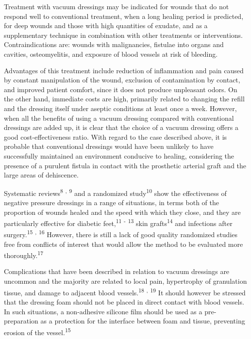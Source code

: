\documentclass[numberinsection,times,10pt,spreadimages]{memoir}
\begin{document}
Treatment with vacuum dressings may be indicated for wounds that do not respond
well to conventional treatment, when a long healing period is predicted, for
deep wounds and those with high quantities of exudate, and as a supplementary
technique in combination with other treatments or interventions.
Contraindications are: wounds with malignancies, fistulae into organs and
cavities, osteomyelitis, and exposure of blood vessels at risk of bleeding.

Advantages of this treatment include reduction of inflammation and pain caused
by
constant manipulation of the wound, exclusion of contamination by contact, and
improved patient comfort, since it does not produce unpleasant odors. On the
other hand, immediate costs are high, primarily related to changing the refill
and the dressing itself under aseptic conditions at least once a week. However,
when all the benefits of using a vacuum dressing compared with conventional
dressings are added up, it is clear that the choice of a vacuum dressing offers
a good cost-effectiveness ratio. With regard to the case described above, it is
probable that conventional dressings would have been unlikely to have
successfully maintained an environment conducive to healing, considering the
presence of a purulent fistula in contact with the prosthetic arterial graft and
the large areas of dehiscence.

Systematic reviews\textsuperscript{8}
\textsuperscript{,}
\textsuperscript{9}
and a randomized study\textsuperscript{10}
show the effectiveness of negative pressure
dressings in a range of situations, in terms both of the proportion of wounds
healed and the speed with which they close, and they are particularly effective
for diabetic feet,\textsuperscript{11}
\textsuperscript{-}
\textsuperscript{13}
skin grafts\textsuperscript{14}
and infections after surgery.\textsuperscript{15}
\textsuperscript{,}
\textsuperscript{16}
However, there is still a lack of good quality
randomized studies free from conflicts of interest that would allow the method
to be evaluated more thoroughly.\textsuperscript{17}

Complications that have been described in relation to vacuum dressings are
uncommon and the majority are related to local pain, hypertrophy of granulation
tissue, and damage to adjacent blood vessels.\textsuperscript{18}
\textsuperscript{,}
\textsuperscript{19}
It should however be stressed that the dressing
foam should not be placed in direct contact with blood vessels. In such
situations, a non-adhesive silicone film should be used as a pre-preparation as
a protection for the interface between foam and tissue, preventing erosion of
the vessel.\textsuperscript{15}
\end{document}
